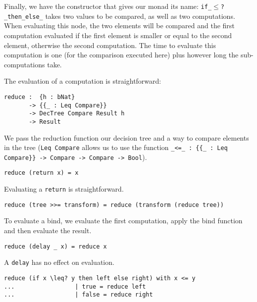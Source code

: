 Finally, we have the constructor that gives our monad its name: \texttt{if\_$\leq$?\_then\_else\_} takes two values to be compared, as well as two computations. When evaluating this node, the two elements will be compared and the first computation evaluated if the first element is smaller or equal to the second element, otherwise the second computation. The time to evaluate this computation is one (for the comparison executed here) plus however long the sub-computations take.

The evaluation of a computation is straightforward:

\begin{lstlisting}[caption={Evaluating the Monad},label={lst:dectree-eval:1},emph={reduce,DecTree}]
reduce :  {h : bNat}
       -> {{_ : Leq Compare}}
       -> DecTree Compare Result h
       -> Result
\end{lstlisting}

We pass the reduction function our decision tree and a way to compare elements in the tree (\texttt{Leq Compare} allows us to use the function \texttt{\_<=\_ : \{\{\_ : Leq Compare\}\} -> Compare -> Compare -> Bool}).


\begin{lstlisting}[caption={Evaluating the Monad},label={lst:dectree-eval:2},emph={reduce,DecTree,return}]
reduce (return x) = x
\end{lstlisting}

Evaluating a \texttt{return} is straightforward.


\begin{lstlisting}[caption={Evaluating the Monad},label={lst:dectree-eval:3},emph={reduce,DecTree}]
reduce (tree >>= transform) = reduce (transform (reduce tree))
\end{lstlisting}

To evaluate a bind, we evaluate the first computation, apply the bind function and then evaluate the result.

\begin{lstlisting}[caption={Evaluating the Monad},label={lst:dectree-eval:4},emph={reduce,DecTree,delay}]
reduce (delay _ x) = reduce x
\end{lstlisting}

A \texttt{delay} has no effect on evaluation.

\begin{lstlisting}[caption={Evaluating the Monad},label={lst:dectree-eval:5},emph={reduce,DecTree,if,then,else}]
reduce (if x \leq? y then left else right) with x <= y
...                 | true = reduce left
...                 | false = reduce right
\end{lstlisting}

